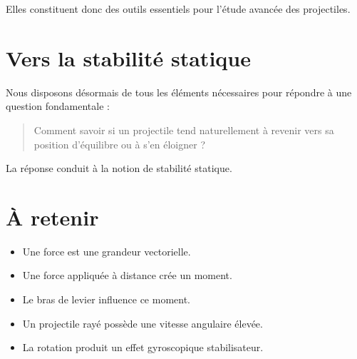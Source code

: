 Elles constituent donc des outils essentiels pour l'étude avancée des
projectiles.

\section{Vers la stabilité statique}

Nous disposons désormais de tous les éléments nécessaires pour répondre à une
question fondamentale :

\begin{quote}
Comment savoir si un projectile tend naturellement à revenir vers sa position
d'équilibre ou à s'en éloigner ?
\end{quote}

La réponse conduit à la notion de stabilité statique.

\section{À retenir}

\begin{aretenir}

\begin{itemize}
    \item Une force est une grandeur vectorielle.
    \item Une force appliquée à distance crée un moment.
    \item Le bras de levier influence ce moment.
    \item Un projectile rayé possède une vitesse angulaire élevée.
    \item La rotation produit un effet gyroscopique stabilisateur.
\end{itemize}

\end{aretenir}

